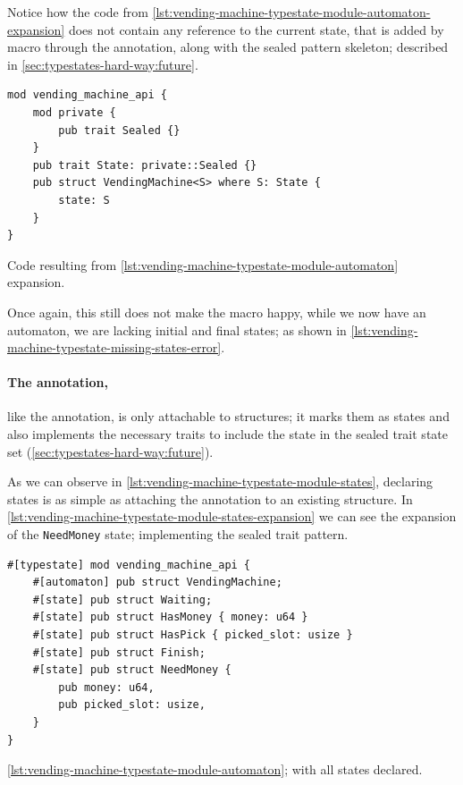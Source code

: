 Notice how the code from \autoref{lst:vending-machine-typestate-module-automaton-expansion} does not contain any reference to the current state,
that is added by macro through the  annotation,
along with the sealed pattern skeleton; described in \autoref{sec:typestates-hard-way:future}.

\begin{listing}
    \begin{verbatim}
mod vending_machine_api {
    mod private {
        pub trait Sealed {}
    }
    pub trait State: private::Sealed {}
    pub struct VendingMachine<S> where S: State {
        state: S
    }
}
    \end{verbatim}
    \caption{Code resulting from \autoref{lst:vending-machine-typestate-module-automaton} expansion.}
    \label{lst:vending-machine-typestate-module-automaton-expansion}
\end{listing}

Once again, this still does not make the macro happy, while we now have an automaton, we are lacking initial and final states;
as shown in \autoref{lst:vending-machine-typestate-missing-states-error}.

\paragraph{The  annotation,} like the  annotation, is only attachable to structures;
it marks them as states and also implements the necessary traits to include the state in the sealed trait state set (\autoref{sec:typestates-hard-way:future}).

As we can observe in \autoref{lst:vending-machine-typestate-module-states},
declaring states is as simple as attaching the annotation to an existing structure.
In \autoref{lst:vending-machine-typestate-module-states-expansion} we can see the expansion of the \texttt{NeedMoney} state;
implementing the sealed trait pattern.

\begin{listing}
    \begin{verbatim}
#[typestate] mod vending_machine_api {
    #[automaton] pub struct VendingMachine;
    #[state] pub struct Waiting;
    #[state] pub struct HasMoney { money: u64 }
    #[state] pub struct HasPick { picked_slot: usize }
    #[state] pub struct Finish;
    #[state] pub struct NeedMoney {
        pub money: u64,
        pub picked_slot: usize,
    }
}
    \end{verbatim}
    \caption{\autoref{lst:vending-machine-typestate-module-automaton}; with all states declared.}
    \label{lst:vending-machine-typestate-module-states}
\end{listing}

